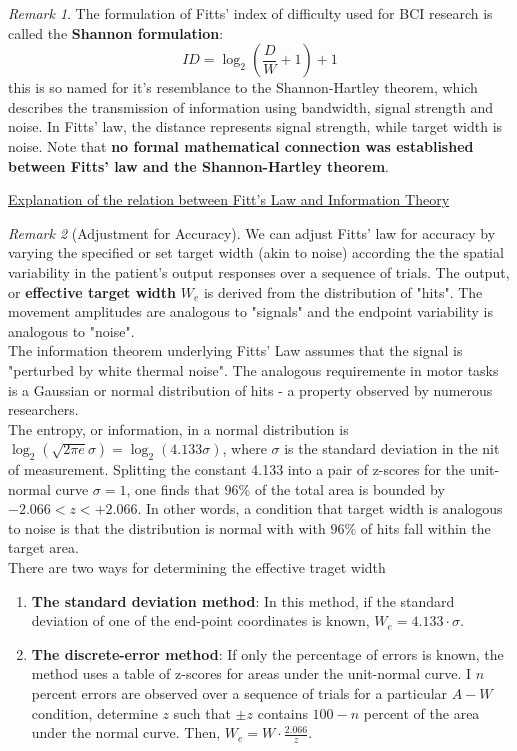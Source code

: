 \documentclass[11pt, a4paper, openany]{report}
\theoremstyle{definition}
\theoremstyle{remark}
\newtheorem{rmk}{Remark}
\begin{document}
\begin{rmk}
    The formulation of Fitts' index of difficulty used for BCI research is called the \textbf{Shannon formulation}:
    \[ ID = \log_2 \left( \frac{D}{W} + 1 \right) + 1\]
    this is so named for it's resemblance to the Shannon-Hartley theorem, which describes the transmission of information using bandwidth, signal strength and noise. In Fitts' law, the distance represents signal strength, while target width is noise. Note that \textbf{no formal mathematical connection was established between Fitts' law and the Shannon-Hartley theorem}.
\end{rmk}

\hyperref[https://www.yorku.ca/mack/JMB89.html]{Explanation of the relation between Fitt's Law and Information Theory}

\begin{rmk}[Adjustment for Accuracy]
    We can adjust Fitts' law for accuracy by varying the specified or set target width (akin to noise) according the the spatial variability in the patient's output responses over a sequence of trials. 
    The output, or \textbf{effective target width} \( W_e \) is derived from the distribution of "hits". The movement amplitudes are analogous to "signals" and the endpoint variability is analogous to "noise". \\

    The information theorem underlying Fitts' Law assumes that the signal is "perturbed by white thermal noise". The analogous requiremente in motor tasks is a Gaussian or normal distribution of hits - a property observed by numerous researchers. \\

    The entropy, or information, in a normal distribution is \( \log_2 \left( \sqrt{2 \pi e} \sigma \right) = \log_{2} \left( 4.133 \sigma\right) \), where \( \sigma \) is the standard deviation in the nit of measurement. Splitting the constant 4.133 into a pair of z-scores for the unit-normal curve \( \sigma = 1 \), one finds that \( 96\% \) of the total area is bounded by \( -2.066 < z < +2.066 \). In other words, a condition that target width is analogous to noise is that the distribution is normal with with \( 96\% \) of hits fall within the target area.\\

    There are two ways for determining the effective traget width
    \begin{enumerate}
        \item \textbf{The standard deviation method}: In this method, if the standard deviation of one of the end-point coordinates is known, \( W_e = 4.133 \cdot \sigma \). 
        \item \textbf{The discrete-error method}: If only the percentage of errors is known, the method uses a table of z-scores for areas under the unit-normal curve. I \( n \) percent errors are observed over a sequence of trials for a particular \( A-W \) condition, determine \( z \) such that \( \pm z \) contains \( 100-n \) percent of the area under the normal curve. Then, \( W_e = W \cdot \frac{2.066}{z} \).
    \end{enumerate}


\end{rmk}
\end{document}
